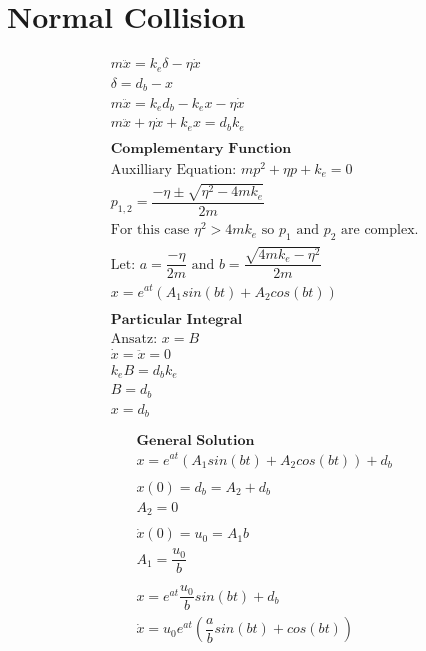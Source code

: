 \documentclass[a4paper,11pt,titlepage]{report}
\begin{document}
\section{Normal Collision}
\label{der:normal collision}
\begin{align*}
&m \ddot{x} = k_e \delta - \eta \dot{x} \\
&\delta = d_b - x \\
&m \ddot{x} = k_e d_b - k_e x - \eta \dot{x} \\
&m \ddot{x} + \eta \dot{x} + k_e x = d_b k_e \\\\
&\textbf{Complementary Function} \\
&\text{Auxilliary Equation: } mp^2 + \eta p + k_e = 0 \\
&p_{1,2} = \dfrac{- \eta \pm \sqrt{\eta^2 - 4 m k_e}}{2 m} \\
&\text{For this case $\eta ^ 2 > 4 m k_e$ so $p_1$ and $p_2$ are complex.} \\
&\text{Let: } a = \dfrac{-\eta}{2m} \text{ and } b = \dfrac{\sqrt{4mk_e - \eta ^ 2}}{2m} \\
&x = e^{at} (A_1 sin(bt) + A_2 cos(bt)) \\\\
&\textbf{Particular Integral} \\
&\text{Ansatz: } x = B \\
&\dot{x} = \ddot{x} = 0 \\
&k_e B = d_b k_e \\
&B = d_b \\
&x = d_b \\\\
\end{align*}
\begin{align*}
&\textbf{General Solution} \\
&x = e^{at} (A_1 sin(bt) + A_2 cos(bt)) + d_b \\\\
&x(0) = d_b = A_2 + d_b \\
&A_2 = 0 \\\\
&\dot{x}(0) = u_0 = A_1 b \\
&A_1 = \dfrac{u_0}{b} \\\\
&x = e^{at} \dfrac{u_0}{b} sin(bt) + d_b \\
&\dot{x} = u_0 e^{at} (\dfrac{a}{b} sin(bt) + cos(bt))
\end{align*}
\end{document}
